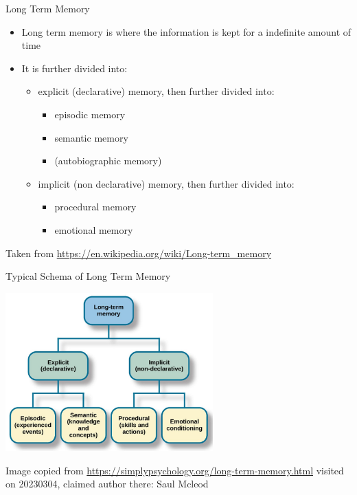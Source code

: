 \documentclass{beamer}
\begin{document}
\begin{frame}
{\centerline{Long Term Memory}}
\begin{itemize}
    \item Long term memory is where the information is kept for a indefinite amount of time
  \item It is further divided into:
  \begin{itemize}
  \item explicit (declarative) memory, then further divided into:
  \begin{itemize}
  \item   episodic memory
  \item semantic memory
  \item (autobiographic memory)
  \end{itemize} 
  \item implicit (non declarative) memory, then further divided into:
    \begin{itemize}
  \item   procedural memory
  \item emotional memory
  \end{itemize} 
\end{itemize} 
\end{itemize} 


\begin{center}
    \tiny{Taken from \url{https://en.wikipedia.org/wiki/Long-term_memory}}
\end{center}

\end{frame}

\begin{frame}
{\centerline{Typical Schema of Long Term Memory}}

\begin{center}

 \includegraphics[width=8cm]{P2023.AIBCCSS.KnowledgeAcquisitionRetentionUse/LongTermMemory.jpg}
 
 \end{center}


\begin{center}
    \tiny{Image copied from \url{https://simplypsychology.org/long-term-memory.html} visited on 20230304, claimed author there: Saul Mcleod}
    \end{center}

\end{frame}
\end{document}
